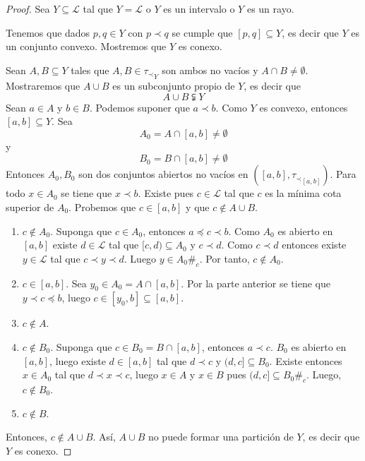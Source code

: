 \documentclass[12pt]{report}
\theoremstyle{largebreak}
\newcommand\contradiction{\ensuremath{\#_c}}
\begin{document}
    \begin{proof}
        Sea $Y\subseteq\mathcal{L}$ tal que $Y=\mathcal{L}$ o $Y$ es un intervalo o $Y$ es un rayo.

        Tenemos que dados $p,q\in Y$ con $p\prec q$ se cumple que $[p,q]\subseteq Y$, es decir que $Y$ es un conjunto convexo. Mostremos que $Y$ es conexo.

        Sean $A,B\subseteq Y$ tales que $A,B\in{\tau_{\prec}}_Y$ son ambos no vacíos y $A\cap B\neq\emptyset$. Mostraremos que $A\cup B$ es un subconjunto propio de $Y$, es decir que
        \begin{equation*}
            A\cup B\subsetneqq Y
        \end{equation*}
        Sean $a\in A$ y $b\in B$. Podemos suponer que $a\prec b$. Como $Y$ es convexo, entonces $[a,b]\subseteq Y$. Sea
        \begin{equation*}
            A_0=A\cap [a,b]\neq\emptyset
        \end{equation*}
        y
        \begin{equation*}
            B_0=B\cap [a,b]\neq\emptyset
        \end{equation*}
        Entonces $A_0,B_0$ son dos conjuntos abiertos no vacíos en $([a,b],{\tau_\prec}_{[a,b]})$. Para todo $x\in A_0$ se tiene que $x\prec b$. Existe pues $c\in\mathcal{L}$ tal que $c$ es la mínima cota superior de $A_0$. Probemos que $c\in[a,b]$ y que $c\notin A\cup B$.
        \begin{enumerate}
            \item $c\notin A_0$. Suponga que $c\in A_0$, entonces $a\preceq c\prec b$. Como $A_0$ es abierto en $[a,b]$ existe $d\in\mathcal{L}$ tal que $[c,d)\subseteq A_0$ y $c\prec d$. Como $c\prec d$ entonces existe $y\in\mathcal{L}$ tal que $c\prec y\prec d$. Luego $y\in A_0$\contradiction. Por tanto, $c\notin A_0$.
            \item $c\in[a,b]$. Sea $y_0\in A_0=A\cap [a,b]$. Por la parte anterior se tiene que $y\prec c\preceq b$, luego $c\in [y_0,b]\subseteq [a,b]$.
            \item $c\notin A$.
            \item $c\notin B_0$. Suponga que $c\in B_0=B\cap [a,b]$, entonces $a\prec c$. $B_0$ es abierto en $[a,b]$, luego existe $d\in[a,b]$ tal que $d\prec c$ y $(d,c]\subseteq B_0$. Existe entonces $x\in A_0$ tal que $d\prec x\prec c$, luego $x\in A$ y $x\in B$ pues $(d,c]\subseteq B_0$\contradiction. Luego, $c\notin B_0$.
            \item $c\notin B$.
        \end{enumerate}
        Entonces, $c\notin A\cup B$. Así, $A\cup B$ no puede formar una partición de $Y$, es decir que $Y$ es conexo.
    \end{proof}
\end{document}
